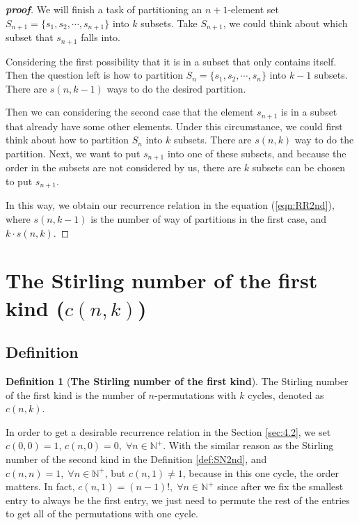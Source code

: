 \documentclass{article}
\theoremstyle{definition}
\newtheorem{definition}{Definition}[section]
\theoremstyle{remark}
\theoremstyle{example}
\begin{document}
\begin{proof}[\textbf{proof}]
    We will finish a task of partitioning an $n+1$-element set $S_{n+1} = \{s_1, s_2, \cdots, s_{n+1}\}$ into $k$ subsets. Take $S_{n+1}$, we could think about which subset that $s_{n+1}$ falls into. 
    
    Considering the first possibility that it is in a subset that only contains itself. Then the question left is how to partition $S_n = \{s_1, s_2, \cdots, s_n\}$ into $k-1$ subsets. There are $s(n,k-1)$ ways to do the desired partition. 
    
    Then we can considering the second case that the element $s_{n+1}$ is in a subset that already have some other elements. Under this circumstance, we could first think about how to partition $S_{n}$ into $k$ subsets. There are $s(n,k)$ way to do the partition. Next, we want to put $s_{n+1}$ into one of these subsets, and because the order in the subsets are not considered by us, there are $k$ subsets can be chosen to put $s_{n+1}$.
    
    In this way, we obtain our recurrence relation in the equation (\ref{eqn:RR2nd}), where $s(n,k-1)$ is the number of way of partitions in the first case, and $k\cdot s(n,k)$.
\end{proof}

\section{\textbf{The Stirling number of the first kind ($c(n,k)$)}}
\subsection{Definition}

\begin{definition}[\textbf{The Stirling number of the first kind}]\label{def:SN1st}
    The Stirling number of the first kind is the number of $n$-permutations with $k$ cycles, denoted as $c(n,k)$.
\end{definition}

In order to get a desirable recurrence relation in the Section \ref{sec:4.2}, we set $c(0,0) = 1$, $c(n,0) = 0, \; \forall n \in \mathbb{N^{+}}$. With the similar reason as the Stirling number of the second kind in the Definition \ref{def:SN2nd}, and $c(n,n) = 1, \; \forall n \in \mathbb{N^{+}}$, but $c(n,1) \neq 1$, because in this one cycle, the order matters. In fact, $c(n,1) = (n-1)!,\; \forall n \in \mathbb{N^{+}}$ since after we fix the smallest entry to always be the first entry, we just need to permute the rest of the entries to get all of the permutations with one cycle.
\end{document}
